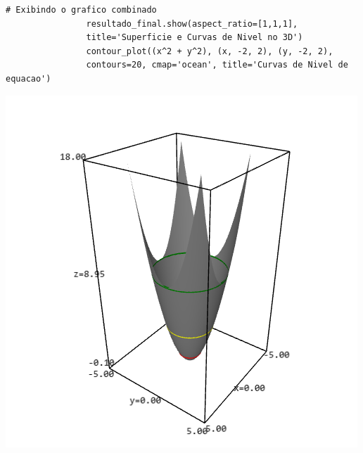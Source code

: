 \documentclass[../main.tex]{subfiles}
\begin{document}
\begin{solucao}
\begin{lstlisting}[style=python_estiloso, caption={estrutura do código da questão 1, itens a), b), c)}]
				# Exibindo o grafico combinado
				resultado_final.show(aspect_ratio=[1,1,1], 
				title='Superficie e Curvas de Nivel no 3D')
				contour_plot((x^2 + y^2), (x, -2, 2), (y, -2, 2), 
				contours=20, cmap='ocean', title='Curvas de Nivel de equacao')
			\end{lstlisting}
			
			\begin{center}
				\begin{minipage}{0.45\textwidth}
					\centering
					\includegraphics[width=\textwidth]{imagens/lista03/picture_lista03_q01_item01.png}
				\end{minipage}
				\hfill
				\begin{minipage}{0.45\textwidth}
					\centering

\end{minipage}
\end{center}
\end{solucao}
\end{document}

